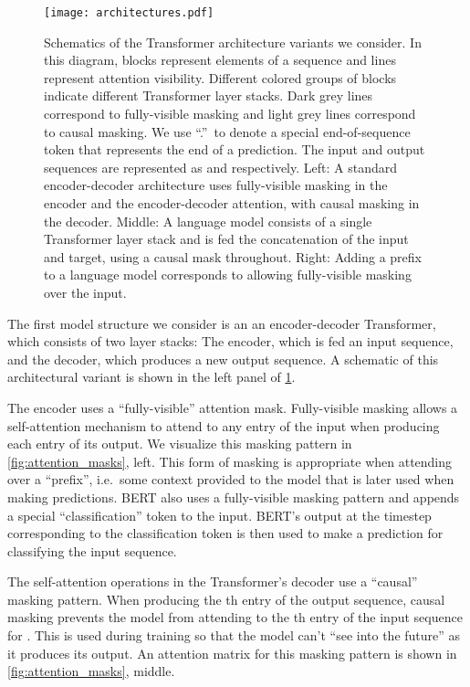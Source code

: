 \documentclass[twoside,11pt]{article}
\begin{document}
\begin{figure}[t]
    \centering
    \texttt{[image: architectures.pdf]}
    \caption{
    Schematics of the Transformer architecture variants we consider.
    In this diagram, blocks represent elements of a sequence and lines represent attention visibility.
    Different colored groups of blocks indicate different Transformer layer stacks.
    Dark grey lines correspond to fully-visible masking and light grey lines correspond to causal masking.
    We use ``.''\ to denote a special end-of-sequence token that represents the end of a prediction.
    The input and output sequences are represented as  and  respectively.
    Left: A standard encoder-decoder architecture uses fully-visible masking in the encoder and the encoder-decoder attention, with causal masking in the decoder.
    Middle: A language model consists of a single Transformer layer stack and is fed the concatenation of the input and target, using a causal mask throughout.
    Right: Adding a prefix to a language model corresponds to allowing fully-visible masking over the input.
    }
    \label{fig:architectures}
\end{figure}

The first model structure we consider is an an encoder-decoder Transformer, which consists of two layer stacks: The encoder, which is fed an input sequence, and the decoder, which produces a new output sequence.
A schematic of this architectural variant is shown in the left panel of \cref{fig:architectures}.

The encoder uses a ``fully-visible'' attention mask.
Fully-visible masking allows a self-attention mechanism to attend to any entry of the input when producing each entry of its output.
We visualize this masking pattern in \cref{fig:attention_masks}, left.
This form of masking is appropriate when attending over a ``prefix'', i.e.\ some context provided to the model that is later used when making predictions.
BERT \citep{devlin2018bert} also uses a fully-visible masking pattern and appends a special ``classification'' token to the input.
BERT's output at the timestep corresponding to the classification token is then used to make a prediction for classifying the input sequence.

The self-attention operations in the Transformer's decoder use a ``causal'' masking pattern.
When producing the th entry of the output sequence, causal masking prevents the model from attending to the th entry of the input sequence for .
This is used during training so that the model can't ``see into the future'' as it produces its output.
An attention matrix for this masking pattern is shown in \cref{fig:attention_masks}, middle.
\end{document}
